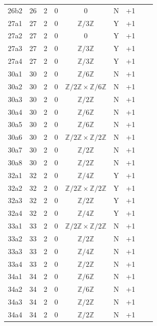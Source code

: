 \begin{longtable}{ccccccccc}
26b2 & 26 & 2 & 0 & 0 & N & +1 &  &  \\
27a1 & 27 & 2 & 0 & $\mathbb{Z}/3\mathbb{Z}$ & Y & +1 &  &  \\
27a2 & 27 & 2 & 0 & 0 & Y & +1 &  &  \\
27a3 & 27 & 2 & 0 & $\mathbb{Z}/3\mathbb{Z}$ & Y & +1 &  &  \\
27a4 & 27 & 2 & 0 & $\mathbb{Z}/3\mathbb{Z}$ & Y & +1 &  &  \\
30a1 & 30 & 2 & 0 & $\mathbb{Z}/6\mathbb{Z}$ & N & +1 &  &  \\
30a2 & 30 & 2 & 0 & $\mathbb{Z}/2\mathbb{Z} \times \mathbb{Z}/6\mathbb{Z}$ & N & +1 &  &  \\
30a3 & 30 & 2 & 0 & $\mathbb{Z}/2\mathbb{Z}$ & N & +1 &  &  \\
30a4 & 30 & 2 & 0 & $\mathbb{Z}/6\mathbb{Z}$ & N & +1 &  &  \\
30a5 & 30 & 2 & 0 & $\mathbb{Z}/6\mathbb{Z}$ & N & +1 &  &  \\
30a6 & 30 & 2 & 0 & $\mathbb{Z}/2\mathbb{Z} \times \mathbb{Z}/2\mathbb{Z}$ & N & +1 &  &  \\
30a7 & 30 & 2 & 0 & $\mathbb{Z}/2\mathbb{Z}$ & N & +1 &  &  \\
30a8 & 30 & 2 & 0 & $\mathbb{Z}/2\mathbb{Z}$ & N & +1 &  &  \\
32a1 & 32 & 2 & 0 & $\mathbb{Z}/4\mathbb{Z}$ & Y & +1 &  &  \\
32a2 & 32 & 2 & 0 & $\mathbb{Z}/2\mathbb{Z} \times \mathbb{Z}/2\mathbb{Z}$ & Y & +1 &  &  \\
32a3 & 32 & 2 & 0 & $\mathbb{Z}/2\mathbb{Z}$ & Y & +1 &  &  \\
32a4 & 32 & 2 & 0 & $\mathbb{Z}/4\mathbb{Z}$ & Y & +1 &  &  \\
33a1 & 33 & 2 & 0 & $\mathbb{Z}/2\mathbb{Z} \times \mathbb{Z}/2\mathbb{Z}$ & N & +1 &  &  \\
33a2 & 33 & 2 & 0 & $\mathbb{Z}/2\mathbb{Z}$ & N & +1 &  &  \\
33a3 & 33 & 2 & 0 & $\mathbb{Z}/4\mathbb{Z}$ & N & +1 &  &  \\
33a4 & 33 & 2 & 0 & $\mathbb{Z}/2\mathbb{Z}$ & N & +1 &  &  \\
34a1 & 34 & 2 & 0 & $\mathbb{Z}/6\mathbb{Z}$ & N & +1 &  &  \\
34a2 & 34 & 2 & 0 & $\mathbb{Z}/6\mathbb{Z}$ & N & +1 &  &  \\
34a3 & 34 & 2 & 0 & $\mathbb{Z}/2\mathbb{Z}$ & N & +1 &  &  \\
34a4 & 34 & 2 & 0 & $\mathbb{Z}/2\mathbb{Z}$ & N & +1 &  &  \\

\end{longtable}

